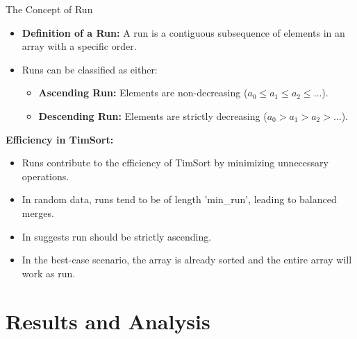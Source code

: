 \documentclass[aspectratio=169]{beamer}
\begin{document}
\begin{frame}{The Concept of Run}
    \begin{itemize}
        \item \textbf{Definition of a Run:} A run is a contiguous subsequence of elements in an array with a specific order.
        \item Runs can be classified as either:
            \begin{itemize}
                \item \textbf{Ascending Run:} Elements are non-decreasing (\(a_0 \leq a_1 \leq a_2 \leq \ldots\)).
                \item \textbf{Descending Run:} Elements are strictly decreasing (\(a_0 > a_1 > a_2 > \ldots\)).
    \end{itemize}
     \end{itemize}
\textbf{Efficiency in TimSort:}
  \begin{itemize}
    \item Runs contribute to the efficiency of TimSort by minimizing unnecessary operations.
    \item In random data, runs tend to be of length 'min\_run', leading to balanced merges.
    \item In \citet{peters2015TimSort} suggests run should be strictly ascending. 
    \item In the best-case scenario, the array is already sorted and the entire array will work as run.
  \end{itemize}

\end{frame}

  
    \section{Results and Analysis}
    
\end{document}
